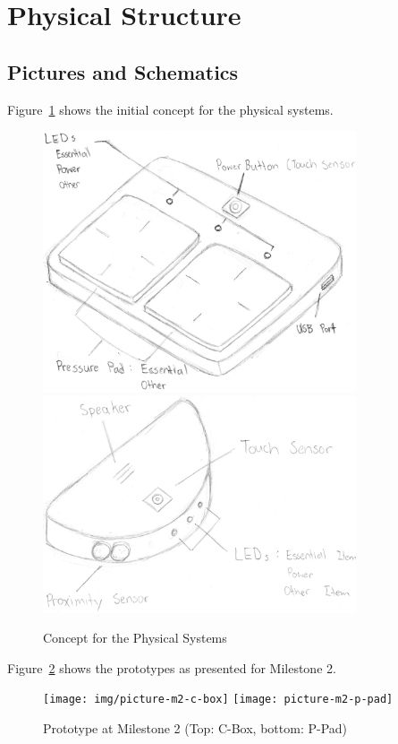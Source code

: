 \documentclass[10pt, oneside, letterpaper, titlepage]{article}
\begin{document}
	\clearpage
	\section{Physical Structure}

		\subsection{Pictures and Schematics}

			Figure~\ref{fig:sketch} shows the initial concept for the physical systems.

			\begin{figure}[!htb]
				\centering
				\includegraphics[width=25em]{sketch-p-pad}
				\includegraphics[width=25em]{sketch-c-box}
				\caption{Concept for the Physical Systems}
				\label{fig:sketch}
			\end{figure}

			\clearpage
			Figure~\ref{fig:picture-m2} shows the prototypes as presented for Milestone 2.

			\begin{figure}[!htb]
				\centering
				\texttt{[image: img/picture-m2-c-box]}
				\texttt{[image: picture-m2-p-pad]}
				\caption{Prototype at Milestone 2 (Top: C-Box, bottom: P-Pad)}
				\label{fig:picture-m2}
			\end{figure}
\end{document}
